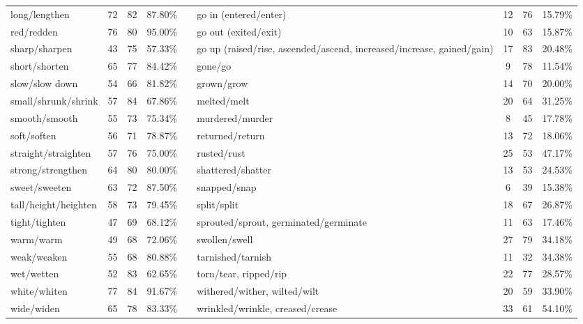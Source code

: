 \begin{tabular}{p{3cm}ccccp{3cm}ccc}
long/lengthen & 72 & 82 & 87.80\% & & go in (entered/enter) & 12 & 76 & 15.79\% \\
red/redden & 76 & 80 & 95.00\% & & go out (exited/exit) & 10 & 63 & 15.87\% \\
sharp/sharpen & 43 & 75 & 57.33\% & & go up (raised/rise, ascended/ascend, increased/increase, gained/gain) & 17 & 83 & 20.48\% \\
short/shorten & 65 & 77 & 84.42\% & & gone/go & 9 & 78 & 11.54\% \\
slow/slow down & 54 & 66 & 81.82\% & & grown/grow & 14 & 70 & 20.00\% \\
small/shrunk/shrink & 57 & 84 & 67.86\% & & melted/melt & 20 & 64 & 31.25\% \\
smooth/smooth & 55 & 73 & 75.34\% & & murdered/murder & 8 & 45 & 17.78\% \\
soft/soften & 56 & 71 & 78.87\% & & returned/return & 13 & 72 & 18.06\% \\
straight/straighten & 57 & 76 & 75.00\% & & rusted/rust & 25 & 53 & 47.17\% \\
strong/strengthen & 64 & 80 & 80.00\% & & shattered/shatter & 13 & 53 & 24.53\% \\
sweet/sweeten & 63 & 72 & 87.50\% & & snapped/snap & 6 & 39 & 15.38\% \\
tall/height/heighten & 58 & 73 & 79.45\% & & split/split & 18 & 67 & 26.87\% \\
tight/tighten & 47 & 69 & 68.12\% & & sprouted/sprout, germinated/germinate & 11 & 63 & 17.46\% \\
warm/warm & 49 & 68 & 72.06\% & & swollen/swell & 27 & 79 & 34.18\% \\
weak/weaken & 55 & 68 & 80.88\% & & tarnished/tarnish & 11 & 32 & 34.38\% \\
wet/wetten & 52 & 83 & 62.65\% & & torn/tear, ripped/rip & 22 & 77 & 28.57\% \\
white/whiten & 77 & 84 & 91.67\% & & withered/wither, wilted/wilt & 20 & 59 & 33.90\% \\
wide/widen & 65 & 78 & 83.33\% & & wrinkled/wrinkle, creased/crease & 33 & 61 & 54.10\%
\end{tabular}